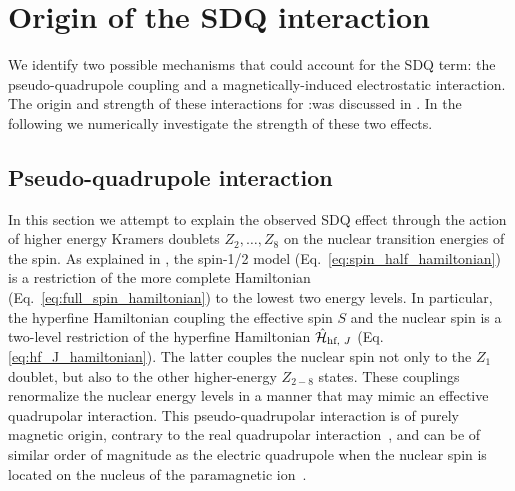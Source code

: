 \section{Origin of the SDQ interaction}

We identify two possible mechanisms that could account for the SDQ term: the pseudo-quadrupole coupling and a magnetically-induced electrostatic interaction. The origin and strength of these interactions for \Er:\Ca was discussed in . In the following we numerically investigate the strength of these two effects.




\subsection{Pseudo-quadrupole interaction}

In this section we attempt to explain the observed SDQ effect through the action of higher energy Kramers doublets $Z_2, \dots,Z_8$ on the nuclear transition energies of the \Nb spin. As explained in , the spin-1/2 model (Eq.~\ref{eq:spin_half_hamiltonian}) is a restriction of the more complete Hamiltonian (Eq.~\ref{eq:full_spin_hamiltonian}) to the lowest two \Er energy levels. In particular, the hyperfine Hamiltonian coupling the effective spin $S$ and the nuclear spin is a two-level restriction of the hyperfine Hamiltonian $\hat{\mathcal{H}}_{\text{hf, $J$}}$ (Eq.\ref{eq:hf_J_hamiltonian}). The latter couples the nuclear spin not only to the $Z_1$ doublet, but also to the other higher-energy $Z_{2-8}$ states. These couplings renormalize the nuclear energy levels in a manner that may mimic an effective quadrupolar interaction. This pseudo-quadrupolar interaction is of purely magnetic origin, contrary to the real quadrupolar interaction~, and can be of similar order of magnitude as the electric quadrupole when the nuclear spin is located on the nucleus of the paramagnetic ion~. 

